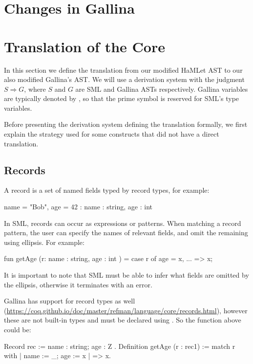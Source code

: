 \documentclass[a4paper,11pt]{article}
\newcommand\stog{\boldsymbol{\Longrightarrow}}
\begin{document}
\section{Changes in Gallina}

\section{Translation of the Core}
In this section we define the translation from our modified HaMLet AST to our
also modified Gallina's AST. We will use a derivation system with the judgment
$S \stog G$, where $S$ and $G$ are SML and Gallina ASTs respectively. Gallina 
variables are typically denoted by , so that the prime symbol 
is reserved for SML's type variables.

Before presenting the derivation system defining the translation
formally, we first explain the strategy used for some constructs that
did not have a direct translation.

\subsection{Records}
\label{sec:records}

A record is a set of named fields typed by record types, for example:

\begin{sml}
{name = "Bob", age = 42} : {name : string, age : int }
\end{sml}

In SML, records can occur as expressions or patterns. When matching a
record pattern, the user can specify the names of relevant fields, and
omit the remaining using ellipsis. For example:

\begin{sml}
fun getAge (r: {name : string, age : int }) = case r of
  {age = x, ...} => x;
\end{sml}

It is important to note that SML must be able to infer what fields are
omitted by the ellipsis, otherwise it terminates with an error.

Gallina has support for record types as well
(\url{https://coq.github.io/doc/master/refman/language/core/records.html}),
however these are not built-in types and must be declared using
. So the  function above could be:

\begin{coq}
Record rec := { name : string; age : Z }.
Definition getAge (r : rec1) := match r with 
  {| name := _; age := x |} => x.
\end{coq}
\end{document}
